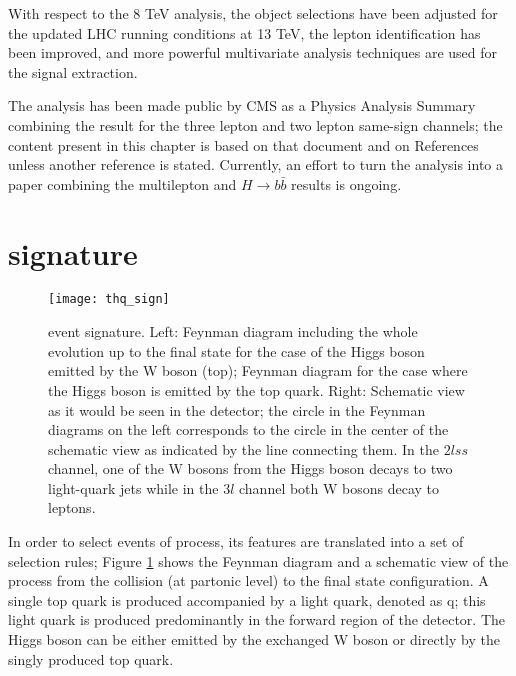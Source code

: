 With respect to the 8 TeV analysis, the object selections have been adjusted for the updated LHC running conditions at 13 TeV, the lepton identification has been improved, and more powerful multivariate analysis techniques are used for the signal extraction.

The analysis has been made public by CMS as a Physics Analysis Summary \cite{CMS_PAS_HIG_17-005} combining the result for the three lepton and two lepton same-sign channels; the content present in this chapter is based on that document and on References ~\cite{CMS_AN_2016-211, CMS_AN_2017-029} unless another reference is stated. Currently, an effort to turn the analysis into a paper combining the multilepton and $H \to b\bar{b}$ results is ongoing. 


\section{\tHq signature}\label{sec:thq_sign}

\begin{figure}[!h]
\begin{center}
\texttt{[image: thq\_sign]}
\end{center}
\caption[\tHq event signature]{\tHq event signature. Left: Feynman diagram including the whole evolution up to the final state for the case of the Higgs boson emitted by the W boson (top); Feynman diagram for the case where the Higgs boson is emitted by the top quark. Right: Schematic view as it would be seen in the detector; the circle in the Feynman diagrams on the left corresponds to the circle in the center of the schematic view as indicated by the line connecting them. In the $2lss$ channel, one of the W bosons from the Higgs boson decays to two light-quark jets while in the $3l$ channel both W bosons decay to leptons.}
\label{fig:thq_sign}
\end{figure}

In order to select events of \tHq process, its features are translated into a set of selection rules; Figure \ref{fig:thq_sign} shows the Feynman diagram and a schematic view of the \tHq process from the \pp collision (at partonic level) to the final state configuration. A single top quark is produced accompanied by a light quark, denoted as q; this light quark is produced predominantly in the forward region of the detector. The Higgs boson can be either emitted by the exchanged W boson or directly by the singly produced top quark.

